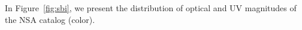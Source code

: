 In Figure~\ref{fig:sbi}, we present the distribution of optical and UV
magnitudes of the NSA catalog (color). 




